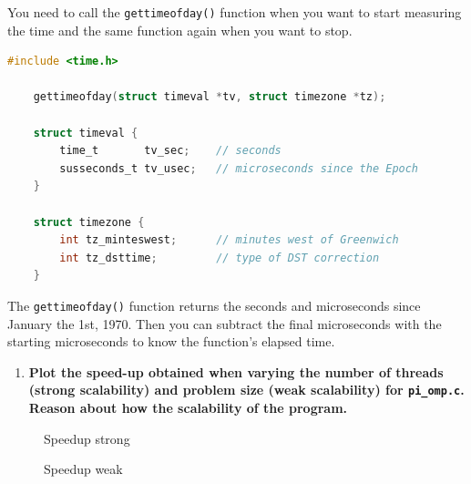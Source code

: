 \documentclass[a4paper]{article}
\begin{document}
You need to call the \texttt{gettimeofday()} function when you want to start measuring the time and the same function again when you want to stop. 

\begin{lstlisting}[language=C]
    #include <time.h>

    gettimeofday(struct timeval *tv, struct timezone *tz);
    
    struct timeval {
        time_t       tv_sec;    // seconds
        susseconds_t tv_usec;   // microseconds since the Epoch
    }
    
    struct timezone {
        int tz_minteswest;      // minutes west of Greenwich
        int tz_dsttime;	        // type of DST correction
    }
\end{lstlisting}

The \texttt{gettimeofday()} function returns the seconds and microseconds since January the 1st, 1970. Then you can subtract the final microseconds with the starting microseconds to know the function's elapsed time. 

\begin{enumerate}[resume]
	\item \textbf{Plot the speed-up obtained when varying the number of threads (strong scalability) and problem size (weak scalability) for \texttt{pi\_omp.c}. Reason about how the scalability of the program.}
\end{enumerate}

\begin{figure}[H]
    \begin{minipage}[t]{0.5\linewidth}
        \caption{Speedup strong}
        \label{fig:speedup_strong}
    \end{minipage}
    \begin{minipage}[t]{0.5\linewidth}
        \caption{Speedup weak}
        \label{fig:speedup_weak}
    \end{minipage}
\end{figure}
\end{document}
